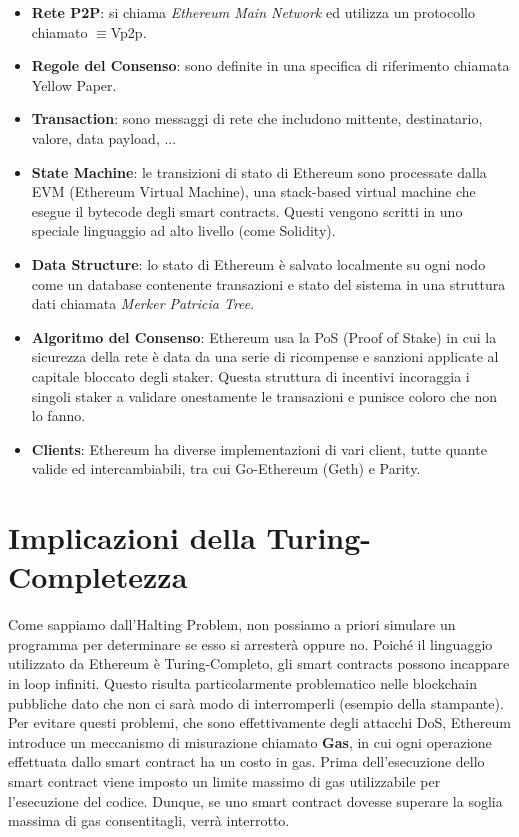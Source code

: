 \begin{itemize}
      \item \textbf{Rete P2P}: si chiama \textit{Ethereum Main Network} ed
            utilizza un protocollo chiamato \DH$\equiv$Vp2p.
      \item \textbf{Regole del Consenso}: sono definite in una specifica di riferimento chiamata
            Yellow Paper.
      \item \textbf{Transaction}: sono messaggi di rete che includono mittente, destinatario,
            valore, data payload, ...
      \item \textbf{State Machine}: le transizioni di stato di Ethereum sono processate dalla
            EVM (Ethereum Virtual Machine), una stack-based virtual machine che esegue il bytecode
            degli smart contracts. Questi vengono scritti in uno speciale linguaggio ad alto livello
            (come Solidity).
      \item \textbf{Data Structure}: lo stato di Ethereum è salvato localmente su ogni nodo come
            un database contenente transazioni e stato del sistema in una struttura dati chiamata
            \textit{Merker Patricia Tree}.
      \item \textbf{Algoritmo del Consenso}: Ethereum usa la PoS (Proof of Stake) in cui la sicurezza della rete è data da una serie di ricompense e sanzioni applicate al capitale bloccato degli staker. Questa struttura di incentivi incoraggia i singoli staker a validare onestamente le transazioni e punisce coloro che non lo fanno.
      \item \textbf{Clients}: Ethereum ha diverse implementazioni di vari client,
            tutte quante valide ed intercambiabili, tra cui Go-Ethereum (Geth) e Parity.
\end{itemize}

\section{Implicazioni della Turing-Completezza}
Come sappiamo dall'Halting Problem, non possiamo a priori simulare un programma per
determinare se esso si arresterà oppure no. Poiché il linguaggio utilizzato da Ethereum è
Turing-Completo, gli smart contracts possono incappare in loop infiniti. Questo risulta
particolarmente problematico nelle blockchain pubbliche dato che non ci sarà modo di interromperli
(esempio della stampante). Per evitare questi problemi, che sono effettivamente degli attacchi DoS,
Ethereum introduce un meccanismo di misurazione chiamato \textbf{Gas}, in cui ogni operazione
effettuata dallo smart contract ha un costo in gas. Prima dell'esecuzione dello smart contract
viene imposto un limite massimo di gas utilizzabile per l'esecuzione del codice.
Dunque, se uno smart contract dovesse superare la soglia massima di gas consentitagli,
verrà interrotto.\\

